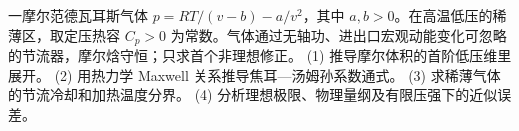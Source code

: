一摩尔范德瓦耳斯气体 \(p=RT/(v-b)-a/v^2\)，其中 \(a,b>0\)。在高温低压的稀薄区，取定压热容 \(C_p>0\) 为常数。气体通过无轴功、进出口宏观动能变化可忽略的节流器，摩尔焓守恒；只求首个非理想修正。
(1) 推导摩尔体积的首阶低压维里展开。
(2) 用热力学 Maxwell 关系推导焦耳—汤姆孙系数通式。
(3) 求稀薄气体的节流冷却和加热温度分界。
(4) 分析理想极限、物理量纲及有限压强下的近似误差。
